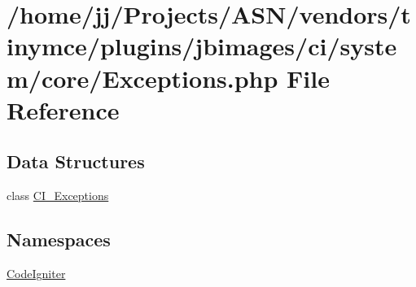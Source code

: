\hypertarget{_exceptions_8php}{}\section{/home/jj/\+Projects/\+A\+S\+N/vendors/tinymce/plugins/jbimages/ci/system/core/\+Exceptions.php File Reference}
\label{_exceptions_8php}
\subsection*{Data Structures}
\begin{DoxyCompactItemize}
\item 
class \hyperlink{class_c_i___exceptions}{C\+I\+\_\+\+Exceptions}
\end{DoxyCompactItemize}
\subsection*{Namespaces}
\begin{DoxyCompactItemize}
\item 
 \hyperlink{namespace_code_igniter}{Code\+Igniter}
\end{DoxyCompactItemize}
